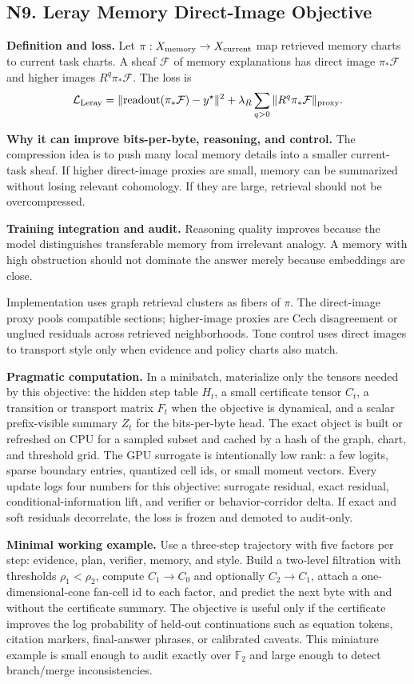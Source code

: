 \documentclass[10pt]{article}
\newcommand{\FF}{\mathbb{F}}
\newcommand{\calF}{\mathcal{F}}
\newcommand{\loss}{\mathcal{L}}
\numberwithin{equation}{section}
\begin{document}
\subsection{N9. Leray Memory Direct-Image Objective}
\noindent\textbf{Definition and loss.} Let $\pi:X_{\rm memory}\to X_{\rm current}$ map retrieved memory charts to current task charts. A sheaf $\calF$ of memory explanations has direct image $\pi_*\calF$ and higher images $R^q\pi_*\calF$. The loss is
\[
\loss_{\rm Leray}=\|\mathrm{readout}(\pi_*\calF)-y^\star\|^2+\lambda_R\sum_{q>0}\|R^q\pi_*\calF\|_{\rm proxy}.
\]

\noindent\textbf{Why it can improve bits-per-byte, reasoning, and control.} The compression idea is to push many local memory details into a smaller current-task sheaf. If higher direct-image proxies are small, memory can be summarized without losing relevant cohomology. If they are large, retrieval should not be overcompressed.

\noindent\textbf{Training integration and audit.} Reasoning quality improves because the model distinguishes transferable memory from irrelevant analogy. A memory with high obstruction should not dominate the answer merely because embeddings are close.

Implementation uses graph retrieval clusters as fibers of $\pi$. The direct-image proxy pools compatible sections; higher-image proxies are Cech disagreement or unglued residuals across retrieved neighborhoods. Tone control uses direct images to transport style only when evidence and policy charts also match.

\noindent\textbf{Pragmatic computation.} In a minibatch, materialize only the tensors needed by this objective: the hidden step table $H_t$, a small certificate tensor $C_t$, a transition or transport matrix $F_t$ when the objective is dynamical, and a scalar prefix-visible summary $Z_t$ for the bits-per-byte head. The exact object is built or refreshed on CPU for a sampled subset and cached by a hash of the graph, chart, and threshold grid. The GPU surrogate is intentionally low rank: a few logits, sparse boundary entries, quantized cell ids, or small moment vectors. Every update logs four numbers for this objective: surrogate residual, exact residual, conditional-information lift, and verifier or behavior-corridor delta. If exact and soft residuals decorrelate, the loss is frozen and demoted to audit-only.

\noindent\textbf{Minimal working example.} Use a three-step trajectory with five factors per step: evidence, plan, verifier, memory, and style. Build a two-level filtration with thresholds $\rho_1<\rho_2$, compute $C_1\to C_0$ and optionally $C_2\to C_1$, attach a one-dimensional-cone fan-cell id to each factor, and predict the next byte with and without the certificate summary. The objective is useful only if the certificate improves the log probability of held-out continuations such as equation tokens, citation markers, final-answer phrases, or calibrated caveats. This miniature example is small enough to audit exactly over $\FF_2$ and large enough to detect branch/merge inconsistencies.
\end{document}
